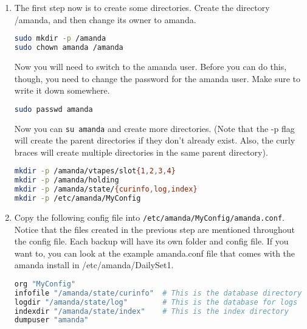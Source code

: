 \documentclass{article}
\begin{document}
\begin{enumerate}

\item The first step now is to create some directories. Create the directory /amanda, and then change its owner to amanda.

\begin{lstlisting}[basicstyle=\ttfamily, backgroundcolor = \color{lightgray}, language = bash, xleftmargin = 0cm, framexleftmargin = 1em]
sudo mkdir -p /amanda
sudo chown amanda /amanda
\end{lstlisting}

Now you will need to switch to the amanda user. Before you can do this, though, you need to change the password for the amanda user. Make sure to write it down somewhere.

\begin{lstlisting}[basicstyle=\ttfamily, backgroundcolor = \color{lightgray}, language = bash, xleftmargin = 0cm, framexleftmargin = 1em]
sudo passwd amanda
\end{lstlisting}

Now you can \verb|su amanda| and create more directories. (Note that the -p flag will create the parent directories if they don't already exist. Also, the curly braces will create multiple directories in the same parent directory).

\begin{lstlisting}[basicstyle=\ttfamily, backgroundcolor = \color{lightgray}, language = bash, xleftmargin = 0cm, framexleftmargin = 1em]
mkdir -p /amanda/vtapes/slot{1,2,3,4}
mkdir -p /amanda/holding
mkdir -p /amanda/state/{curinfo,log,index}
mkdir -p /etc/amanda/MyConfig 
\end{lstlisting}

\item Copy the following config file into \verb|/etc/amanda/MyConfig/amanda.conf|. Notice that the files created in the previous step are mentioned throughout the config file. Each backup will have its own folder and config file. If you want to, you can look at the example amanda.conf file that comes with the amanda install in /etc/amanda/DailySet1.

\begin{lstlisting}[basicstyle=\ttfamily, backgroundcolor = \color{lightgray}, language = bash, xleftmargin = 0cm, framexleftmargin = 1em]
org "MyConfig"
infofile "/amanda/state/curinfo"  # This is the database directory
logdir "/amanda/state/log"        # This is the database for logs
indexdir "/amanda/state/index"    # This is the index directory
dumpuser "amanda"


\end{lstlisting}
\end{enumerate}
\end{document}
